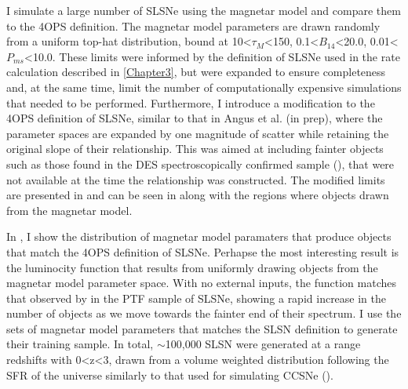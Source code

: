 I simulate a large number of SLSNe using the magnetar model and compare them to the 4OPS definition. The magnetar model parameters are drawn randomly from a uniform top-hat distribution, bound at 10<$\tau_M$<150, 0.1<$B_{14}$<20.0, 0.01<$P_{ms}$<10.0. These limits were informed by the definition of SLSNe used in the rate calculation described in \cref{Chapter3}, but were expanded to ensure completeness and, at the same time, limit the number of computationally expensive simulations that needed to be performed. Furthermore, I introduce a modification to the 4OPS definition of SLSNe, similar to that in Angus et al. (in prep), where the parameter spaces are expanded by one magnitude of scatter while retaining the original slope of their relationship. This was aimed at including fainter objects such as those found in the DES spectroscopically confirmed sample (), that were not available at the time the relationship was constructed. The modified limits are presented in  and can be seen in  along with the regions where objects drawn from the magnetar model.

\begin{table}
  \caption{}
  \label{tab:4OPS}

\end{table}

\begin{figure}
  \caption{}
  \label{fig:4OPSMag}
\end{figure}

In , I show the distribution of magnetar model paramaters that produce objects that match the 4OPS definition of SLSNe. Perhapse the most interesting result is the luminocity function that results from uniformly drawing objects from the magnetar model parameter space. With no external inputs, the function matches that observed by \citet{DeCia2017} in the PTF sample of SLSNe, showing a rapid increase in the number of objects as we move towards the fainter end of their spectrum. I use the sets of magnetar model parameters that matches the SLSN definition to generate their training sample. In total, $\sim$100,000 SLSN were generated at a range redshifts with 0<z<3, drawn from a volume weighted distribution following the SFR of the universe \citep{Beacon2004} similarly to that used for simulating CCSNe ().

